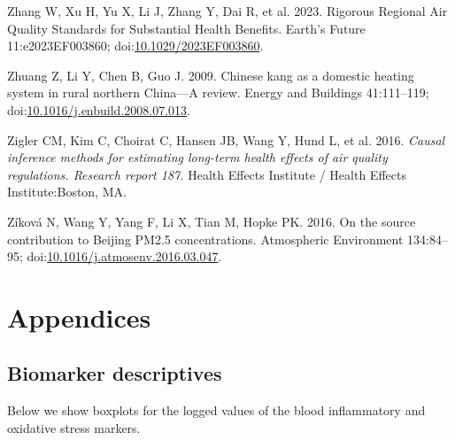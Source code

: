 \documentclass[
  letterpaper,
  DIV=11,
  numbers=noendperiod]{scrartcl}
\newlength{\cslhangindent}
\newenvironment{CSLReferences}[2] %
 {\begin{list}{}{%
  \setlength{\itemindent}{0pt}
  \setlength{\leftmargin}{0pt}
  \setlength{\parsep}{0pt}
  \ifodd #1
   \setlength{\leftmargin}{\cslhangindent}
   \setlength{\itemindent}{-1\cslhangindent}
  \fi
  \setlength{\itemsep}{#2\baselineskip}}}
 {\end{list}}
\begin{document}
\begin{CSLReferences}{1}{1}
Zhang W, Xu H, Yu X, Li J, Zhang Y, Dai R, et al. 2023. Rigorous
{Regional Air Quality Standards} for {Substantial Health Benefits}.
Earth's Future 11:e2023EF003860;
doi:\href{https://doi.org/10.1029/2023EF003860}{10.1029/2023EF003860}.

Zhuang Z, Li Y, Chen B, Guo J. 2009. Chinese kang as a domestic heating
system in rural northern {China}---{A} review. Energy and Buildings
41:111--119;
doi:\href{https://doi.org/10.1016/j.enbuild.2008.07.013}{10.1016/j.enbuild.2008.07.013}.

Zigler CM, Kim C, Choirat C, Hansen JB, Wang Y, Hund L, et al. 2016.
\emph{Causal inference methods for estimating long-term health effects
of air quality regulations. {Research} report 187.} Health Effects
Institute / Health Effects Institute:Boston, MA.

Zíková N, Wang Y, Yang F, Li X, Tian M, Hopke PK. 2016. On the source
contribution to {Beijing PM2}.5 concentrations. Atmospheric Environment
134:84--95;
doi:\href{https://doi.org/10.1016/j.atmosenv.2016.03.047}{10.1016/j.atmosenv.2016.03.047}.

\end{CSLReferences}

\newpage
\appendix
\renewcommand{\thefigure}{A\arabic{figure}}
\renewcommand{\thetable}{A\arabic{table}}
\setcounter{figure}{0}
\setcounter{table}{0}

\section{Appendices}\label{appendices}

\subsection{Biomarker descriptives}\label{biomarker-descriptives}

Below we show boxplots for the logged values of the blood inflammatory
and oxidative stress markers.
\end{document}
